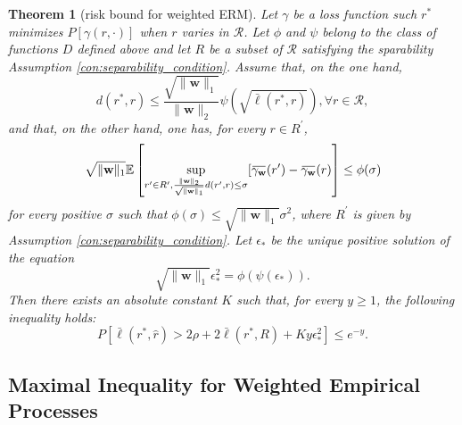 \documentclass[letterpaper]{article} %
\newtheorem{theorem}{Theorem}
\newcommand{\E}{\mathbb{E}}
\newcommand{\Pro}{P}
\newcommand{\overbar}[1]{\mkern 1.5mu\overline{\mkern-1.5mu#1\mkern-1.5mu}\mkern 1.5mu}
\newcommand*\cen[1]{\overbar{#1}}
\newcommand{\weight}{\mathbf{w}}
\newcommand{\relossf}{\bar{\ell}}
\newcommand{\cenprocess}[1]{\cen{\gamma_{#1}}}
\newcommand{\normo}[1]{\|#1\|_1}
\begin{document}
\begin{theorem}[risk bound for weighted ERM]
    \label{th:weighted_erm_risk_bounds}
    Let $\gamma$ be a loss function such $r^*$ minimizes $\Pro[\gamma(r,\cdot)]$ when $r$ varies in $\mathcal{R}$. Let $\phi$ and $\psi$ belong to the class of functions $D$ defined above and let $R$ be a subset of $\mathcal R$ satisfying the sparability Assumption \ref{con:separability_condition}. Assume that, on the one hand,
    \begin{equation}
        \label{eq:weighted_erm_risk_bound_con1}
        d(r^*,r)\le \frac{\sqrt{\normo{\weight{}}}}{\|\weight{}\|_2}\psi(\sqrt{\relossf(r^*,r)}), \forall r\in \mathcal R,
    \end{equation}
    and that, on the other hand, one has, for every $r\in R^\prime$,
    \begin{equation}
        \label{eq:weighted_erm_risk_bound_con2}
        \sqrt{\normo{\weight{}}}\E\left[\sup_{r'\in R^\prime,\frac{\|\weight{}\|_2}{\sqrt{\normo{\weight{}}}}d(r',r)\le \sigma}[\cenprocess{\weight}(r')-\cenprocess{\weight}(r)\right]\le \phi(\sigma)
    \end{equation}
    for every positive $\sigma$ such that $\phi(\sigma)\le \sqrt{\normo{\weight{}}}\sigma^2$, where $R^\prime$ is given by Assumption \ref{con:separability_condition}. Let $\epsilon_*$ be the unique positive solution of the equation
    \begin{equation}
        \label{eq:risk_bound_con3}
        \sqrt{\normo{\weight{}}}\epsilon_*^2=\phi(\psi(\epsilon_*)).
    \end{equation}
    Then there exists an absolute constant $K$ such that, for every $y\ge 1$, the following inequality holds:
    \begin{equation}
        \label{eq:risk_bound_probability}
        \Pro\left[\relossf(r^*,\hat{r})>2\rho+2\relossf(r^*,R)+K y\epsilon_*^2\right]\le e^{-y}.
    \end{equation}
\end{theorem}


\subsection{Maximal Inequality for Weighted Empirical Processes} %
\label{sub:maximal_inequality_for_weighted_processes}

\end{document}
